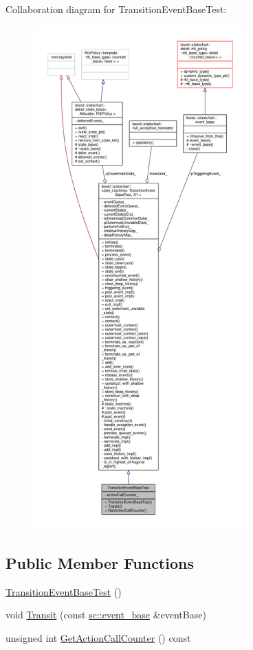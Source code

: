 Collaboration diagram for Transition\+Event\+Base\+Test\+:
\nopagebreak
\begin{figure}[H]
\begin{center}
\leavevmode
\includegraphics[height=550pt]{struct_transition_event_base_test__coll__graph}
\end{center}
\end{figure}
\subsection*{Public Member Functions}
\begin{DoxyCompactItemize}
\item 
\mbox{\hyperlink{struct_transition_event_base_test_ad99f32a33552937b669d06c9a3fc0dd7}{Transition\+Event\+Base\+Test}} ()
\item 
void \mbox{\hyperlink{struct_transition_event_base_test_a51e7226f3256cceaf604f958287bcd8b}{Transit}} (const \mbox{\hyperlink{classboost_1_1statechart_1_1event__base}{sc\+::event\+\_\+base}} \&event\+Base)
\item 
unsigned int \mbox{\hyperlink{struct_transition_event_base_test_aaa7342cb01aaa149b772ca279fdb4473}{Get\+Action\+Call\+Counter}} () const
\end{DoxyCompactItemize}
